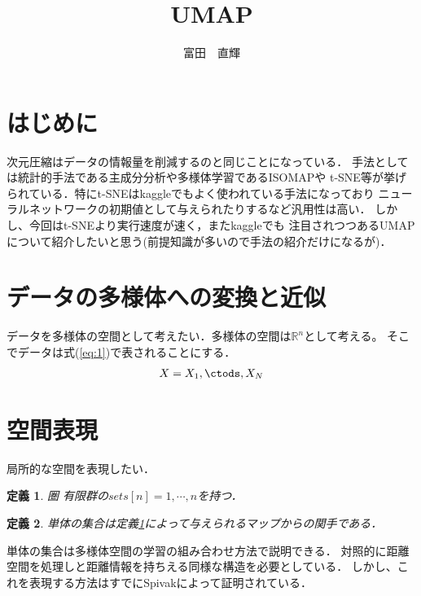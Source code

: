 \documentclass{jsarticle}
\title{UMAP}
\author{富田　直輝}
\newtheorem{dfn}{定義}
\begin{document}
\maketitle
\section{はじめに}
次元圧縮はデータの情報量を削減するのと同じことになっている．
手法としては統計的手法である主成分分析や多様体学習であるISOMAPや
t-SNE等が挙げられている．特にt-SNEはkaggleでもよく使われている手法になっており
ニューラルネットワークの初期値として与えられたりするなど汎用性は高い．
しかし、今回はt-SNEより実行速度が速く，またkaggleでも
注目されつつあるUMAPについて紹介したいと思う(前提知識が多いので手法の紹介だけになるが)．

\section{データの多様体への変換と近似}
データを多様体の空間として考えたい．多様体の空間は$\mathbb{R}^n$として考える。
そこでデータは式(\ref{eq:1})で表されることにする．
\begin{eqnarray}
  \label{eq:1}
  X={X_1,\ctods,X_N}
\end{eqnarray}


\section{空間表現}
局所的な空間を表現したい．
\begin{dfn}
  \label{den:1}
  圏
  有限群の$sets[n]={1,\cdots,n}$を持つ．
\end{dfn}

\begin{dfn}
  単体の集合は定義\ref{den:1}によって与えられるマップからの関手である．
\end{dfn}

単体の集合は多様体空間の学習の組み合わせ方法で説明できる．
対照的に距離空間を処理しと距離情報を持ちえる同様な構造を必要としている．
しかし、これを表現する方法はすでにSpivakによって証明されている．
\end{document}
